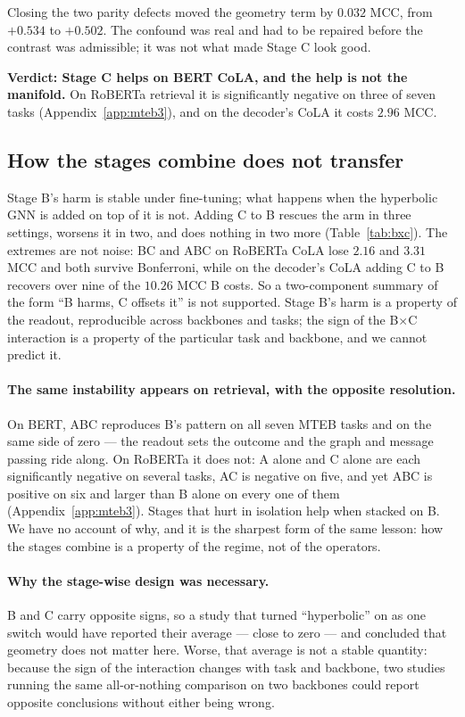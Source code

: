 \documentclass{article}
\begin{document}
Closing the two parity defects moved the geometry term by $0.032$ MCC, from
$+0.534$ to $+0.502$. The confound was real and had to be repaired before the
contrast was admissible; it was not what made Stage C look good.

\textbf{Verdict: Stage C helps on BERT CoLA, and the help is not the manifold.}
On RoBERTa retrieval it is significantly negative on three of seven tasks
(Appendix~\ref{app:mteb3}), and on the decoder's CoLA it costs $2.96$ MCC.

\subsection{How the stages combine does not transfer}
\label{sec:interaction}

Stage B's harm is stable under fine-tuning; what happens when the hyperbolic GNN
is added on top of it is not. Adding C to B rescues the arm in three settings,
worsens it in two, and does nothing in two more (Table~\ref{tab:bxc}). The
extremes are not noise: BC and ABC on RoBERTa CoLA lose $2.16$ and $3.31$ MCC
and both survive Bonferroni, while on the decoder's CoLA adding C to B recovers
over nine of the $10.26$ MCC B costs. So a two-component summary of the form
``B harms, C offsets it'' is not supported. Stage B's harm is a property of the
readout, reproducible across backbones and tasks; the sign of the B$\times$C
interaction is a property of the particular task and backbone, and we cannot
predict it.

\paragraph{The same instability appears on retrieval, with the opposite
resolution.} On BERT, ABC reproduces B's pattern on all seven MTEB tasks and on
the same side of zero --- the readout sets the outcome and the graph and message
passing ride along. On RoBERTa it does not: A alone and C alone are each
significantly negative on several tasks, AC is negative on five, and yet ABC is
positive on six and larger than B alone on every one of them
(Appendix~\ref{app:mteb3}). Stages that hurt in isolation help when stacked on
B. We have no account of why, and it is the sharpest form of the same lesson:
how the stages combine is a property of the regime, not of the operators.

\paragraph{Why the stage-wise design was necessary.} B and C carry opposite
signs, so a study that turned ``hyperbolic'' on as one switch would have
reported their average --- close to zero --- and concluded that geometry does
not matter here. Worse, that average is not a stable quantity: because the sign
of the interaction changes with task and backbone, two studies running the same
all-or-nothing comparison on two backbones could report opposite conclusions
without either being wrong.
\end{document}
